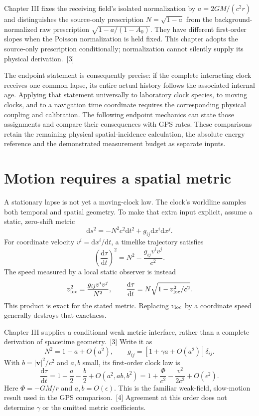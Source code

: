 \documentclass[10pt,twocolumn,letterpaper]{article}
\newcommand{\dd}{\mathrm{d}}
\begin{document}
Chapter III fixes the receiving field's isolated normalization by $a=2GM/(c^2r)$ and distinguishes the source-only prescription $N=\sqrt{1-a}$ from the background-normalized raw prescription $\sqrt{1-a/(1-A_0)}$. They have different first-order slopes when the Poisson normalization is held fixed. This chapter adopts the source-only prescription conditionally; normalization cannot silently supply its physical derivation.~[3]

The endpoint statement is consequently precise: if the complete interacting clock receives one common lapse, its entire actual history follows the associated internal age. Applying that statement universally to laboratory clock species, to moving clocks, and to a navigation time coordinate requires the corresponding physical coupling and calibration. The following endpoint mechanics can state those assignments and compare their consequences with GPS rates. These comparisons retain the remaining physical spatial-incidence calculation, the absolute energy reference and the demonstrated measurement budget as separate inputs.


\section{Motion requires a spatial metric}
A stationary lapse is not yet a moving-clock law. The clock's worldline samples both temporal and spatial geometry. To make that extra input explicit, assume a static, zero-shift metric
\[
 \dd s^2=-N^2c^2\dd t^2+g_{ij}\dd x^i\dd x^j.
\]
For coordinate velocity $v^i=\dd x^i/\dd t$, a timelike trajectory satisfies
\[
 \left(\frac{\dd\tau}{\dd t}\right)^2
 =N^2-\frac{g_{ij}v^iv^j}{c^2}.
\]
The speed measured by a local static observer is instead
\[
 v_{\rm loc}^2=\frac{g_{ij}v^iv^j}{N^2},\qquad
 \frac{\dd\tau}{\dd t}=N\sqrt{1-v_{\rm loc}^2/c^2}.
\]
This product is exact for the stated metric. Replacing $v_{\rm loc}$ by a coordinate speed generally destroys that exactness.

Chapter III supplies a conditional weak metric interface, rather than a complete derivation of spacetime geometry.~[3] Write it as
\[
 N^2=1-a+O(a^2),\qquad
 g_{ij}=[1+\gamma a+O(a^2)]\delta_{ij}.
\]
With $b=|\bm v|^2/c^2$ and $a,b$ small, its first-order clock law is
\[
 \frac{\dd\tau}{\dd t}
 =1-\frac a 2-\frac b 2+O(a^2,ab,b^2)
 =1+\frac{\Phi}{c^2}-\frac{v^2}{2c^2}+O(\epsilon^2).
\]
Here $\Phi=-GM/r$ and $a,b=O(\epsilon)$. This is the familiar weak-field, slow-motion result used in the GPS comparison.~[4] Agreement at this order does not determine $\gamma$ or the omitted metric coefficients.
\end{document}
